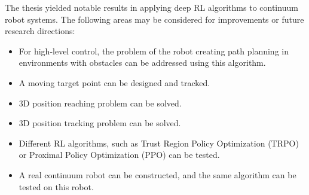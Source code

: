 \documentclass[12pt,twoside,a4]{mwbk}
\begin{document}
The thesis yielded notable results in applying deep RL algorithms to continuum robot systems. The following areas may be considered for improvements or future research directions:
\begin{itemize}
    \item For high-level control, the problem of the robot creating path planning in environments with obstacles can be addressed using this algorithm.
    \item A moving target point can be designed and tracked.
    \item 3D position reaching problem can be solved.
    \item 3D position tracking problem can be solved.
    \item Different RL algorithms, such as Trust Region Policy Optimization (TRPO) or Proximal Policy Optimization (PPO) can be tested.
    \item  A real continuum robot can be constructed, and the same algorithm can be tested on this robot.
\end{itemize}
\end{document}
